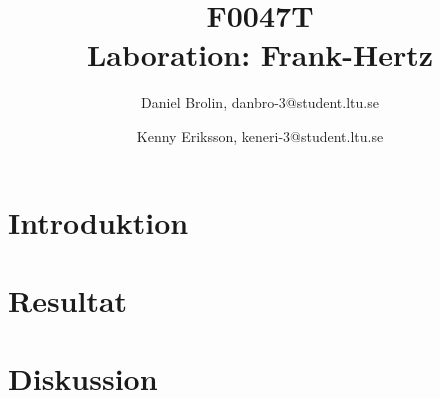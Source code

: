 ﻿\documentclass{article}
\title{F0047T\\Laboration: Frank-Hertz}
\author{Daniel Brolin, danbro-3@student.ltu.se \and Kenny Eriksson, keneri-3@student.ltu.se}
\numberwithin{equation}{section}
\begin{document}
\maketitle
\newpage

\begin{abstract}

\end{abstract}
\newpage
 


\setcounter{page}{1}

\section{Introduktion}

\newpage

\section{Resultat}

\newpage

\section{Diskussion}

\end{document}
